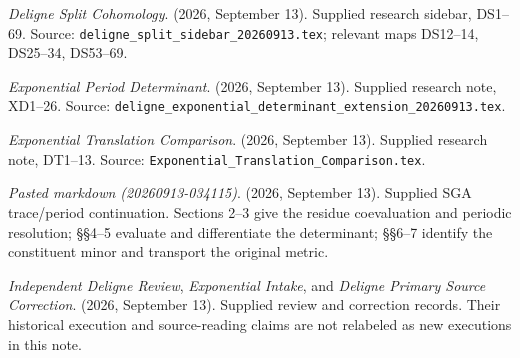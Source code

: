 \documentclass[
  11pt,
]{article}
\begin{document}
\emph{Deligne Split Cohomology}. (2026, September 13). Supplied research
sidebar, DS1--69. Source:
\texttt{deligne\_split\_sidebar\_20260913.tex}; relevant maps DS12--14,
DS25--34, DS53--69.

\emph{Exponential Period Determinant}. (2026, September 13). Supplied
research note, XD1--26. Source:
\texttt{deligne\_exponential\_determinant\_extension\_20260913.tex}.

\emph{Exponential Translation Comparison}. (2026, September 13).
Supplied research note, DT1--13. Source:
\texttt{Exponential\_Translation\_Comparison.tex}.

\emph{Pasted markdown (20260913-034115)}. (2026, September 13). Supplied
SGA trace/period continuation. Sections 2--3 give the residue
coevaluation and periodic resolution; §§4--5 evaluate and differentiate
the determinant; §§6--7 identify the constituent minor and transport the
original metric.

\emph{Independent Deligne Review}, \emph{Exponential Intake}, and
\emph{Deligne Primary Source Correction}. (2026, September 13). Supplied
review and correction records. Their historical execution and
source-reading claims are not relabeled as new executions in this note.
\end{document}
